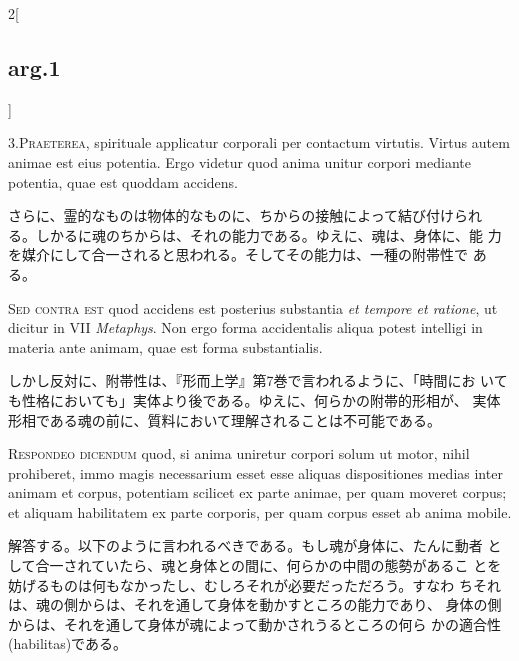 \documentclass[paper=a4paper,fontsize=10pt,jafontsize=9pt,titlepage]{jlreq}
\begin{document}
\begin{paracol}{2}[\subsection{arg.1}]



3.{\scshape Praeterea}, spirituale applicatur corporali per contactum
virtutis. Virtus autem animae est eius potentia. Ergo videtur quod
anima unitur corpori mediante potentia, quae est quoddam accidens.

\switchcolumn

 さらに、霊的なものは物体的なものに、ちからの接触によって結び付けられ
 る。しかるに魂のちからは、それの能力である。ゆえに、魂は、身体に、能
 力を媒介にして合一されると思われる。そしてその能力は、一種の附帯性で
 ある。
 
\switchcolumn*[\subsection{s.c.}]



{\scshape Sed contra est} quod accidens est posterius substantia
{\itshape et tempore et ratione}, ut dicitur in VII {\itshape
Metaphys}. Non ergo forma accidentalis aliqua potest intelligi in
materia ante animam, quae est forma substantialis.

\switchcolumn

 しかし反対に、附帯性は、『形而上学』第7巻で言われるように、「時間にお
 いても性格においても」実体より後である。ゆえに、何らかの附帯的形相が、
 実体形相である魂の前に、質料において理解されることは不可能である。
 



 {\scshape Respondeo dicendum} quod, si anima uniretur corpori solum
 ut motor, nihil prohiberet, immo magis necessarium esset esse aliquas
 dispositiones medias inter animam et corpus, potentiam scilicet ex
 parte animae, per quam moveret corpus; et aliquam habilitatem ex
 parte corporis, per quam corpus esset ab anima mobile.

\switchcolumn

 解答する。以下のように言われるべきである。もし魂が身体に、たんに動者
 として合一されていたら、魂と身体との間に、何らかの中間の態勢があるこ
 とを妨げるものは何もなかったし、むしろそれが必要だっただろう。すなわ
 ちそれは、魂の側からは、それを通して身体を動かすところの能力であり、
 身体の側からは、それを通して身体が魂によって動かされうるところの何ら
 かの適合性(habilitas)である。
 

\end{paracol}
\end{document}
